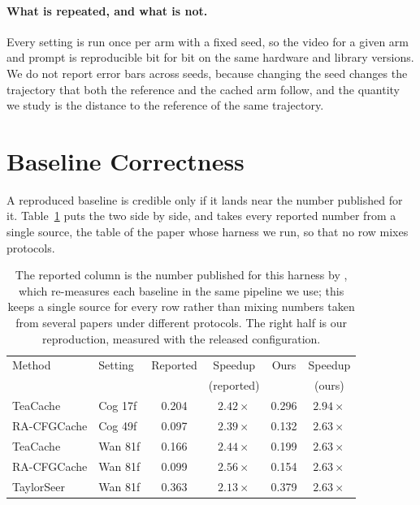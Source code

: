 \paragraph{What is repeated, and what is not.} Every setting is run once per arm with a fixed seed, so the video for a given arm and prompt is reproducible bit for bit on the same hardware and library versions. We do not report error bars across seeds, because changing the seed changes the trajectory that both the reference and the cached arm follow, and the quantity we study is the distance to the reference of the same trajectory.

\section{Baseline Correctness}
\label{app:baseline}

A reproduced baseline is credible only if it lands near the number published for it. Table~\ref{tab:repro} puts the two side by side, and takes every reported number from a single source, the table of the paper whose harness we run, so that no row mixes protocols.

\begin{table}[h]
\centering\footnotesize\setlength{\tabcolsep}{4pt}
\begin{tabular}{llcccc}
\toprule
Method & Setting & Reported & Speedup & Ours & Speedup \\
 & & \citep{liu2026racfgcache} & (reported) & & (ours) \\
\midrule
TeaCache & Cog 17f & 0.204 & $2.42\times$ & 0.296 & $2.94\times$ \\
RA-CFGCache & Cog 49f & 0.097 & $2.39\times$ & 0.132 & $2.63\times$ \\
TeaCache & Wan 81f & 0.166 & $2.44\times$ & 0.199 & $2.63\times$ \\
RA-CFGCache & Wan 81f & 0.099 & $2.56\times$ & 0.154 & $2.63\times$ \\
TaylorSeer & Wan 81f & 0.363 & $2.13\times$ & 0.379 & $2.63\times$ \\
\bottomrule
\end{tabular}
\caption{The reported column is the number published for this harness by \citet{liu2026racfgcache}, which re-measures each baseline in the same pipeline we use; this keeps a single source for every row rather than mixing numbers taken from several papers under different protocols. The right half is our reproduction, measured with the released configuration.}
\label{tab:repro}
\end{table}


